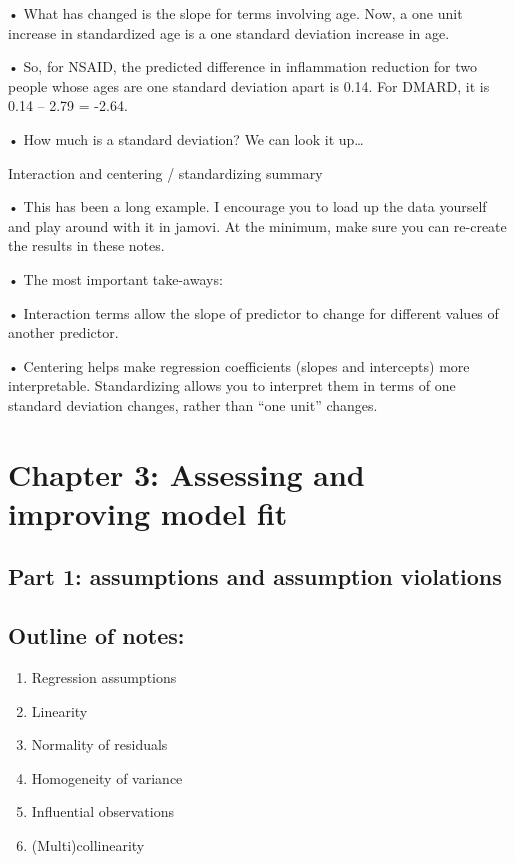 \documentclass[
  letterpaper,
  DIV=11,
  numbers=noendperiod]{scrreprt}
\providecommand{\tightlist}{%
  \setlength{\itemsep}{0pt}\setlength{\parskip}{0pt}}\usepackage{longtable,booktabs,array}
\begin{document}
• What has changed is the slope for terms involving age. Now, a one unit
increase in standardized age is a one standard deviation increase in
age.

• So, for NSAID, the predicted difference in inflammation reduction for
two people whose ages are one standard deviation apart is 0.14. For
DMARD, it is 0.14 -- 2.79 = -2.64.

• How much is a standard deviation? We can look it up\ldots{}

Interaction and centering / standardizing summary

• This has been a long example. I encourage you to load up the data
yourself and play around with it in jamovi. At the minimum, make sure
you can re-create the results in these notes.

• The most important take-aways:

• Interaction terms allow the slope of predictor to change for different
values of another predictor.

• Centering helps make regression coefficients (slopes and intercepts)
more interpretable. Standardizing allows you to interpret them in terms
of one standard deviation changes, rather than ``one unit'' changes.


\hypertarget{chapter-3-assessing-and-improving-model-fit}{%
\chapter{Chapter 3: Assessing and improving model
fit}\label{chapter-3-assessing-and-improving-model-fit}}

\hypertarget{part-1-assumptions-and-assumption-violations}{%
\section{Part 1: assumptions and assumption
violations}\label{part-1-assumptions-and-assumption-violations}}

\hypertarget{outline-of-notes-1}{%
\section{Outline of notes:}\label{outline-of-notes-1}}

\begin{enumerate}
\def\labelenumi{\arabic{enumi}.}
\tightlist
\item
  Regression assumptions
\item
  Linearity
\item
  Normality of residuals
\item
  Homogeneity of variance
\item
  Influential observations
\item
  (Multi)collinearity
\end{enumerate}
\end{document}
